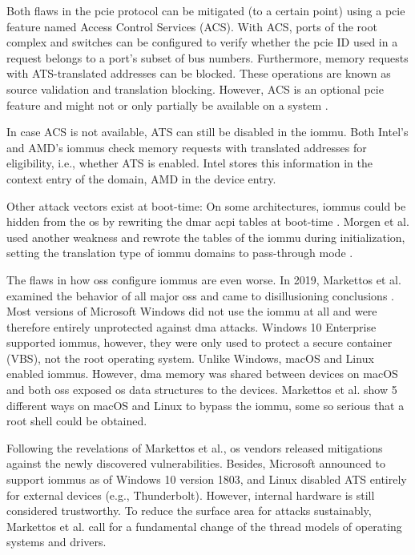Both flaws in the \ac{pcie} protocol can be mitigated (to a certain point) using
a \ac{pcie} feature named Access Control Services (ACS). With ACS, ports of the
root complex and switches can be configured to verify whether the \ac{pcie} ID
used in a request belongs to a port's subset of bus numbers. Furthermore, memory
requests with ATS-translated addresses can be blocked. These operations are
known as source validation and translation blocking. However, ACS is an optional
\ac{pcie} feature and might not or only partially be available on a system
\cite[p.~582]{pcie2017specification}.

In case ACS is not available, ATS can still be disabled in the \ac{iommu}. Both
Intel's and AMD's \acp{iommu} check memory requests with translated addresses
for eligibility, i.e., whether ATS is enabled. Intel stores this information in
the context entry of the domain, AMD in the device entry.

Other attack vectors exist at boot-time: On some architectures, \acp{iommu}
could be hidden from the \ac{os} by rewriting the \ac{dmar} \ac{acpi} tables at
boot-time \cite{wojtczuk2009another}. Morgen et al. used another weakness and
rewrote the tables of the \ac{iommu} during initialization, setting the
translation type of \ac{iommu} domains to pass-through mode
\cite{morgan2018iommu}.

The flaws in how \aclp{os} configure \acp{iommu} are even worse. In 2019,
Markettos et al. examined the behavior of all major \acp{os} and came to
disillusioning conclusions \cite{markettos2019thunderclap}. Most versions of
Microsoft Windows did not use the \ac{iommu} at all and were therefore entirely
unprotected against \ac{dma} attacks. Windows 10 Enterprise supported
\acp{iommu}, however, they were only used to protect a secure container (VBS),
not the root operating system. Unlike Windows, macOS and Linux enabled
\acp{iommu}. However, \ac{dma} memory was shared between devices on macOS and
both \aclp{os} exposed \ac{os} data structures to the devices. Markettos et al.
show 5 different ways on macOS and Linux to bypass the \ac{iommu}, some so
serious that a root shell could be obtained.

Following the revelations of Markettos et al., \ac{os} vendors released
mitigations against the newly discovered vulnerabilities. Besides, Microsoft
announced to support \acp{iommu} as of Windows 10 version 1803, and Linux
disabled ATS entirely for external devices (e.g., Thunderbolt). However,
internal hardware is still considered trustworthy. To reduce the surface area
for attacks sustainably, Markettos et al. call for a fundamental change of the
thread models of operating systems and drivers.


